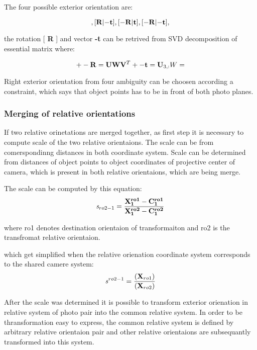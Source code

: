 \documentclass[a4paper,12pt]{report}
\newcommand{\ematr}[1]{
{\bf #1}
}
\newcommand{\evect}[1]{
{\bf #1}
}
\newcommand{\escal}[1]{
{\it #1}
}
\begin{document}
\begin{itemize}
The four possible exterior orientation are:

\begin{equation}
[\ematr{R}|\evect{t}],
[\ematr{R}|\evect{-t}],
[\ematr{-R}|\evect{t}],
[\ematr{-R}|\evect{-t}],
\end{equation}

the rotation [\ematr{R}] and vector \evect{-t} can be retrived from SVD decomposition of essential matrix 
where:

\begin{equation}
+- \ematr{R} = \ematr{U}  \ematr{W} \ematr{V}^{T}
+- \evect{t} = \evect{U}_{3,:}
W = 
\end{equation}


Right exterior orientation from four ambiguity can be choosen according a constraint, which says that object points has to be in front
of both photo planes.


\subsubsection{Merging of relative orientations}
\label{sec:ess_chain}

If two relative orinetations are merged together, as first step it is necessary to compute scale of the two relative orientaions.
The scale can be from comerspondinng distances in both coordinate system. Scale can be determined from distances of 
object points to object coordinates of projective center of camera, which is present in both relative orientaions, which are being merge.

The scale can be computed by this equation:
\begin{equation}
\escal{s}_{ro2-1} = \frac{\mathbf{\evect{X}^{ro1}_{1} - \evect{C^{ro1}_{1}}}}
	                {\mathbf{\evect{X}^{ro2}_{1} - \evect{C^{ro2}_{1}}}}
\end{equation}

where ro1 denotes destination orientaion of transformaiton and ro2 is the transfromat relative orientaion. 

which get simplified when the relative orienation coordinate system  corresponds to the shared camere system: 
\begin{equation}
\escal{s}^{ro2-1} = \frac{\mathbf(\evect{X}_{ro1})}
	                 {\mathbf(\evect{X}_{ro2})}
\end{equation}

After the scale was determined it is possible to transform exterior orienation in relative system of photo pair into the common relative system.
In order to be thransformation easy to express, the common relative system is defined by arbitrary relative orientaion pair and other 
relative orientaions are subsequantly transformed into this system. 


\end{itemize}
\end{document}

